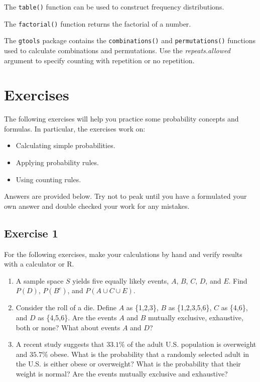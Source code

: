 \documentclass[
  letterpaper,
  DIV=11,
  numbers=noendperiod]{scrreprt}
\begin{document}
The \texttt{table()} function can be used to construct frequency
distributions.

The \texttt{factorial()} function returns the factorial of a number.

The \texttt{gtools} package contains the \texttt{combinations()} and
\texttt{permutations()} functions used to calculate combinations and
permutations. Use the \emph{repeats.allowed} argument to specify
counting with repetition or no repetition.

\hypertarget{exercises-7}{%
\section{Exercises}\label{exercises-7}}

The following exercises will help you practice some probability concepts
and formulas. In particular, the exercises work on:

\begin{itemize}
\item
  Calculating simple probabilities.
\item
  Applying probability rules.
\item
  Using counting rules.
\end{itemize}

Answers are provided below. Try not to peak until you have a formulated
your own answer and double checked your work for any mistakes.

\hypertarget{exercise-1-14}{%
\subsection*{Exercise 1}\label{exercise-1-14}}

For the following exercises, make your calculations by hand and verify
results with a calculator or R.

\begin{enumerate}
\def\labelenumi{\arabic{enumi}.}
\item
  A sample space \(S\) yields five equally likely events, \(A\), \(B\),
  \(C\), \(D\), and \(E\). Find \(P(D)\), \(P(B^c)\), and
  \(P(A \cup C \cup E)\).
\item
  Consider the roll of a die. Define \(A\) as \{1,2,3\}, \(B\) as
  \{1,2,3,5,6\}, \(C\) as \{4,6\}, and \(D\) as \{4,5,6\}. Are the
  events \(A\) and \(B\) mutually exclusive, exhaustive, both or none?
  What about events \(A\) and \(D\)?
\item
  A recent study suggests that \(33.1\)\% of the adult U.S. population
  is overweight and \(35.7\)\% obese. What is the probability that a
  randomly selected adult in the U.S. is either obese or overweight?
  What is the probability that their weight is normal? Are the events
  mutually exclusive and exhaustive?
\end{enumerate}
\end{document}
